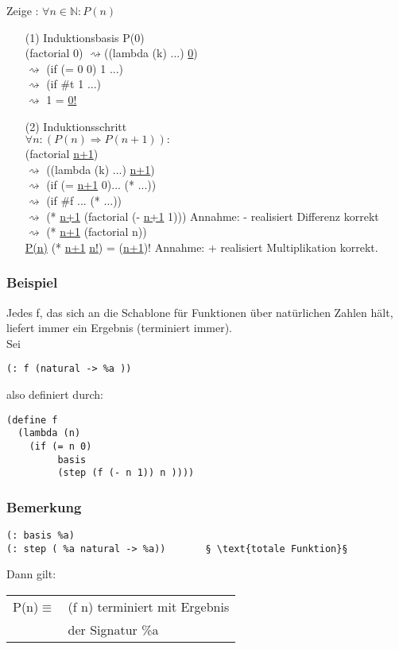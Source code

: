 \documentclass[a4paper,12pt]{article}
\begin{document}
Zeige : $\forall n\in \mathbb{N}: P(n)$
\begin{itemize}
\item[(1)] Induktionsbasis P(0)\\
(factorial 0)
$\rightsquigarrow$((lambda (k) ...) \uline{0})\\
$\rightsquigarrow$ (if (= 0 0) 1 ...)\\
$\rightsquigarrow$ (if \#t 1 ...)\\
$\rightsquigarrow$ 1 = \uline{0!}
\item[(2)] Induktionsschritt \\
$\forall n : (P(n) \Rightarrow P(n+1)):$\\
(factorial \uline{n+1})\\
$\rightsquigarrow$ ((lambda (k) ...) \uline{n+1})\\
$\rightsquigarrow$ (if (= \uline{n+1} 0)... (* ...))\\
$\rightsquigarrow$ (if \#f ... (* ...))\\
$\rightsquigarrow$ (* \uline{n+1} (factorial (- \uline{n+1} 1))) \hfil Annahme: - realisiert Differenz korrekt\\
$\rightsquigarrow$ (* \uline{n+1} (factorial n)) \\
\uline{P(n)} (* \uline{n+1} \uline{n!}) = (\uline{n+1})! \checkmark \hfil Annahme: + realisiert Multiplikation korrekt.
\end{itemize}
\subsubsection{Beispiel}
Jedes f, das sich an die Schablone für Funktionen über natürlichen Zahlen hält, liefert immer ein Ergebnis (terminiert immer).\\
Sei 
\begin{lstlisting}[style=customc]
(: f (natural -> %a ))
\end{lstlisting} 
also definiert durch:
\begin{lstlisting}[style=customc]
(define f
  (lambda (n)
    (if (= n 0)
         basis
         (step (f (- n 1)) n ))))
\end{lstlisting}
\subsubsection{Bemerkung}
\begin{lstlisting}[style=customc]
(: basis %a)
(: step ( %a natural -> %a))       § \text{totale Funktion}§
\end{lstlisting}
Dann gilt:\\
\begin{tabular}{ll}
P(n)$\equiv$ & (f n) terminiert mit Ergebnis \\
& der Signatur \%a
\end{tabular}\\
\end{document}
